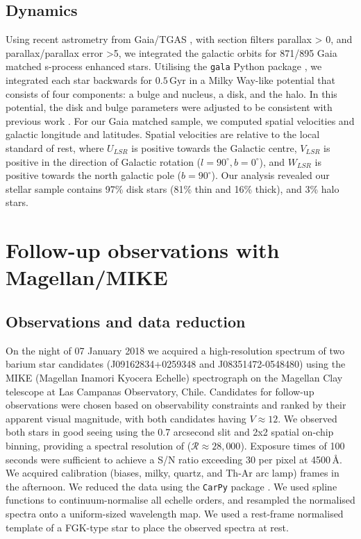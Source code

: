 \documentclass[a4paper,fleqn,usenatbib]{mnras}
\begin{document}
\subsection{Dynamics}
Using recent astrometry from Gaia/TGAS \citep{gaia2016,gaia2018b, cropper2018, katz2018, lindegren2018, sartoretti2018}, with section filters parallax > 0, and parallax/parallax error >5, we integrated the galactic orbits for 871/895 Gaia matched s-process enhanced stars. Utilising the \texttt{gala} Python package \citep{price2017}, we integrated each star backwards for $0.5\,\textrm{Gyr}$ in a Milky Way-like potential that consists of four components: a \citet{hernquist1990} bulge and nucleus, a \citet{miyamoto1975} disk, and the \citet{nfw1997} halo. In this potential, the disk and bulge parameters were adjusted to be consistent with previous work \citep{bovy2015}. For our Gaia matched sample, we computed spatial velocities and galactic longitude and latitudes. Spatial velocities are relative to the local standard of rest, where $U_{LSR}$ is positive towards the Galactic centre, $V_{LSR}$ is positive in the direction of Galactic rotation ($l=90^{\circ}, b=0^{\circ}$), and $W_{LSR}$ is positive towards the north galactic pole ($b=90^{\circ}$). Our analysis revealed our stellar sample contains 97\% disk stars (81\% thin and 16\% thick), and 3\% halo stars.

\section{Follow-up observations with Magellan/MIKE} \label{sec:observations}

\subsection{Observations and data reduction}
On the night of 07 January 2018 we acquired a high-resolution spectrum of two barium star candidates (J09162834+0259348 and J08351472-0548480) using the MIKE (Magellan Inamori Kyocera Echelle) \citep{bernstein2003} spectrograph on the Magellan Clay telescope \citep{schectman2003} at Las Campanas Observatory, Chile. Candidates for follow-up observations were chosen based on observability constraints and ranked by their apparent visual magnitude, with both candidates having $V \approx 12$. We observed both stars in good seeing using the 0.7 arcsecond slit and 2x2 spatial on-chip binning, providing a spectral resolution of ($\mathcal{R} \approx 28,000$). Exposure times of 100 seconds were sufficient to achieve a S/N ratio exceeding 30 per pixel at 4500\,\AA. We acquired calibration (biases, milky, quartz, and Th-Ar arc lamp) frames in the afternoon. We reduced the data using the \texttt{CarPy} package \citep{kelson2000}. We used spline functions to continuum-normalise all echelle orders, and resampled the normalised spectra onto a uniform-sized wavelength map. We used a rest-frame normalised template of a FGK-type star to place the observed spectra at rest.
\end{document}
